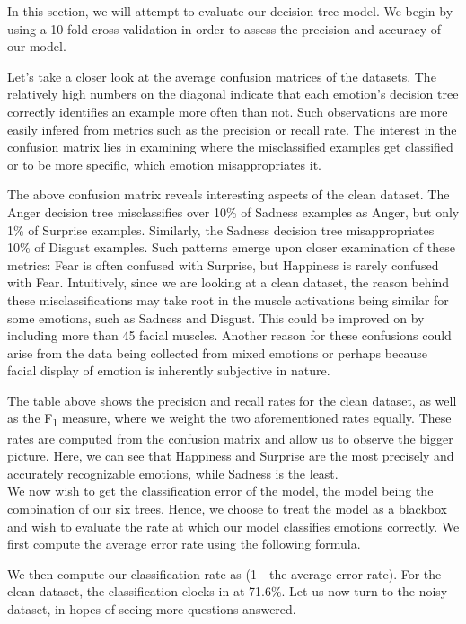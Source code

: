 In this section, we will attempt to evaluate our decision tree model. We begin by using a 10-fold cross-validation
in order to assess the precision and accuracy of our model. 

Let's take a closer look at the average confusion matrices of the datasets.
The relatively high numbers on the diagonal indicate that each emotion's decision tree correctly
identifies an example more often than not. Such observations are more easily infered from metrics such as the precision or recall rate.
The interest in the confusion matrix lies in examining where the misclassified examples get classified or to be more specific,
which emotion misappropriates it. 

\newpage


The above confusion matrix reveals interesting aspects of the clean dataset.
The Anger decision tree misclassifies over 10\% of Sadness examples as Anger, but only 1\% of Surprise examples.
Similarly, the Sadness decision tree misappropriates 10\% of Disgust examples.
Such patterns emerge upon closer examination of these metrics: Fear is often confused with Surprise, but Happiness is rarely confused with Fear.
Intuitively, since we are looking at a clean dataset,
the reason behind these misclassifications may take root in the muscle activations being similar for some emotions, such as Sadness and Disgust.
This could be improved on by including  more than 45 facial muscles.
Another reason for these confusions could arise from the data being collected from mixed emotions or perhaps because facial display
of emotion is inherently subjective in nature.



The table above shows the precision and recall rates for the clean dataset, as well as the F\textsubscript{1} measure,
where we weight the two aforementioned rates equally. These rates are computed from the confusion matrix and allow us to
observe the bigger picture. Here, we can see that Happiness and Surprise are the most precisely and accurately recognizable
emotions, while Sadness is the least. \\



We now wish to get the classification error of the model, the model being the combination of our six trees.
Hence, we choose to treat the model as a blackbox and wish to evaluate the rate at which our model classifies emotions correctly.
We first compute the average error rate using the following formula.

We then compute our classification rate as (1 - the average error rate).
For the clean dataset, the classification clocks in at 71.6\%.
Let us now turn to the noisy dataset, in hopes of seeing more questions answered.

